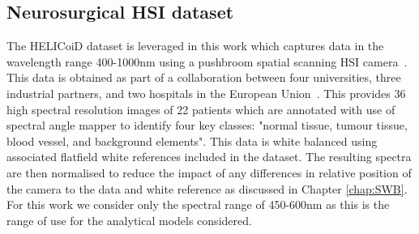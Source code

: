 \subsection{Neurosurgical HSI dataset}\label{sec:NeuroHSIdata}
The HELICoiD dataset is leveraged in this work which captures data in the wavelength range 400-1000nm using a pushbroom spatial scanning HSI camera~\citep{Fabelo2019}. This data is obtained as part of a collaboration between four universities, three industrial partners, and two hospitals in the European Union~\citep{Fabelo2019}. This provides 36 high spectral resolution images of 22 patients which are annotated with use of spectral angle mapper to identify four key classes: "normal tissue, tumour tissue, blood vessel, and background elements". This data is white balanced using associated flatfield white references included in the dataset. The resulting spectra are then normalised to reduce the impact of any differences in relative position of the camera to the data and white reference as discussed in Chapter \ref{chap:SWB}. For this work we consider only the spectral range of 450-600nm as this is the range of use for the analytical models considered. 

